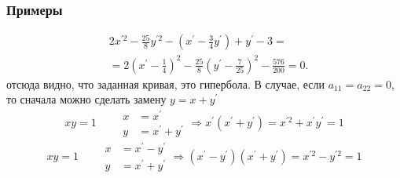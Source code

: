 \documentclass[10pt]{beamer}
\begin{document}
    \begin{frame}
        \frametitle{Примеры}
        \begin{equation}
            \begin{aligned}
                & 2x^{\prime 2} - \frac{25}{8} y^{\prime 2} - \left(x^\prime - \frac{3}{4}y^\prime\right) + y^\prime - 3 = \\
                & = 2 \left(x^\prime - \frac{1}{4} \right)^2 - \frac{25}{8}\left(y^\prime - \frac{7}{25}\right)^2-\frac{576}{200} = 0.
            \end{aligned}
        \end{equation}
        отсюда видно, что заданная кривая, это гипербола.
        В случае, если $a_{11} = a_{22} = 0$, то сначала можно сделать замену $y = x + y^\prime$
        \begin{equation*}
            xy = 1
            \qquad
            \begin{aligned}
                x & = x^\prime \\
                y & = x^\prime + y^\prime
            \end{aligned}
            \Longrightarrow 
            x^\prime (x^\prime + y^\prime) = x^{\prime 2} +  x^\prime y^\prime = 1
        \end{equation*}
        \noindent\makebox[\linewidth]{\rule{\textwidth}{0.4pt}}
        \begin{equation*}
            xy = 1
            \qquad
            \begin{aligned}
                x & = x^\prime - y^\prime \\
                y & = x^\prime + y^\prime
            \end{aligned}
            \Longrightarrow 
            (x^\prime - y^\prime)(x^\prime + y^\prime) = x^{\prime 2} - y^{\prime 2} = 1
        \end{equation*}
    \end{frame}
\end{document}
